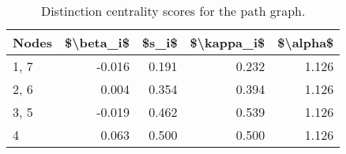 \begin{table}
\centering
\caption{\label{tab:path}Distinction centrality scores for the path graph.}
\centering
\begin{tabular}[t]{lrrrr}
\toprule
Nodes & \$\textbackslash{}beta\_i\$ & \$s\_i\$ & \$\textbackslash{}kappa\_i\$ & \$\textbackslash{}alpha\$\\
\midrule
1, 7 & -0.016 & 0.191 & 0.232 & 1.126\\
2, 6 & 0.004 & 0.354 & 0.394 & 1.126\\
3, 5 & -0.019 & 0.462 & 0.539 & 1.126\\
4 & 0.063 & 0.500 & 0.500 & 1.126\\
\bottomrule
\end{tabular}
\end{table}
